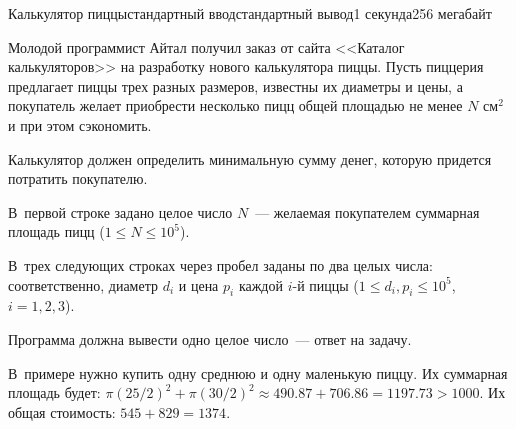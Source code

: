 \begin{problem}{Калькулятор пиццы}{стандартный ввод}{стандартный вывод}{1 секунда}{256 мегабайт}

Молодой программист Айтал получил заказ от сайта <<Каталог калькуляторов>> на разработку нового калькулятора пиццы. Пусть пиццерия предлагает пиццы трех разных размеров, известны их диаметры и цены, а покупатель желает приобрести несколько пицц общей площадью не менее $N$ $\mbox{см}^2$ и при этом сэкономить.

Калькулятор должен определить минимальную сумму денег, которую придется потратить покупателю.

\InputFile
В~первой строке задано целое число $N$~--- желаемая покупателем суммарная площадь пицц ($1 \leq N \leq 10^5$).

В~трех следующих строках через пробел заданы по два целых числа: соответственно, диаметр $d_i$ и цена $p_i$ каждой $i$-й пиццы ($1 \leq d_i, p_i \leq 10^5$, $i = 1, 2, 3$).

\OutputFile
Программа должна вывести одно целое число~--- ответ на задачу.

\Example

\begin{example}
%
\end{example}

\Note
В~примере нужно купить одну среднюю и одну маленькую пиццу. Их суммарная площадь будет: $\pi(25/2)^2 + \pi(30/2)^2 \approx 490.87 + 706.86 = 1197.73 > 1000$. Их общая стоимость: $545 + 829 = 1374$.

\end{problem}


